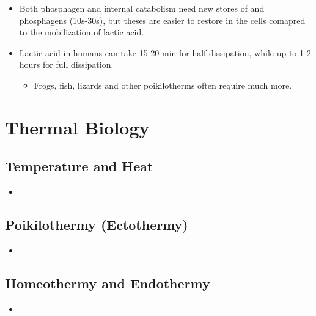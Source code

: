 \documentclass[12pt,a4paper]{article}
\begin{document}
\begin{itemize}
\begin{itemize}
\begin{itemize}
                \item Both phosphagen and internal catabolism need new stores of  and phosphagens (10s-30s), but theses are easier to restore in the cells comapred to the mobilization of lactic acid.
                \item Lactic acid in humans can take 15-20 min for half dissipation, while up to 1-2 hours for full dissipation.
                    \begin{itemize}
                        \item Frogs, fish, lizards and other poikilotherms often require much more.
                    \end{itemize}
            \end{itemize}
    \end{itemize}
\end{itemize}

\section{Thermal Biology}
\subsection{Temperature and Heat}
\begin{itemize}
    \item 
\end{itemize}

\subsection{Poikilothermy (Ectothermy)}
\begin{itemize}
    \item 
\end{itemize}

\subsection{Homeothermy and Endothermy}
\begin{itemize}
    \item 
\end{itemize}

\end{document}

